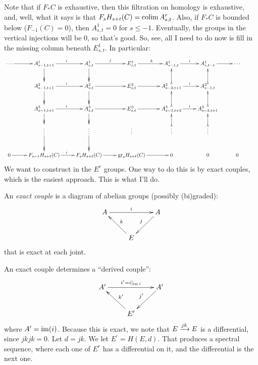 Note that if $F_\ast C$ is exhaustive, then this filtration on homology is exhaustive, and, well, what it says is that $F_s H_{s+t}(C) = \operatorname{colim} A^r_{s,t}$.
Also, if $F_\ast C$ is bounded below ($F_{-1}(C) = 0$), then $A^1_{s,t} = 0$ for $s\leq -1$.
Eventually, the groups in the vertical injections will be $0$, so that's good.
So, see, all I need to do now is fill in the missing column beneath $E^1_{s,t}$.
In particular:
\begin{equation*}
    \xymatrix{
	\cdots\ar[r] & A^1_{s-1,t+1}\ar@{->>}[d] \ar[r]^i & A^1_{s,t} \ar@{->>}[d] \ar[r]^j & E^1_{s,t} \ar[r]^k & A^1_{s-1,t}\ar[r]^i & A^1_{s,t-1} \ar[r] & \cdots\\
	& A^2_{s-1,t+1}\ar@{->>}[d]\ar[r]^i & A^2_{s,t}\ar@{->>}[d]\ar[r] & E^2_{s,t}\ar[r] & A^2_{s-2,t+1}\ar[r]^i \ar@{>->}[u] & A^2_{s-1,t}\ar@{>->}[u] & \\
	& A^3_{s-1,t+1}\ar[r]^i\ar@{->>}[d] & A^3_{s,t}\ar@{->>}[d] \ar[r] & E^3_{s,t}\ar[r] & A^3_{s-3,t+2}\ar@{>->}[u]\ar[r]^i & A^3_{s-2,t+1}\ar@{>->}[u] &\\
	& \vdots\ar@{->>}[d] & \vdots\ar@{->>}[d] & \vdots & \vdots \ar@{>->}[u] & \vdots\ar@{>->}[u] &\\
	0\ar[r] & F_{s-1} H_{s+t}(C) \ar[r]^i & F_s H_{s+t}(C) \ar[r] & \gr_s H_{s+t}(C)\ar[r] & 0 & 0 & 0 &
    }
\end{equation*}
We want to construct in the $E^r$ groups.
One way to do this is by exact couples, which is the easiest approach.
This is what I'll do.
\begin{definition}
    An \emph{exact couple} is a diagram of abelian groups (possibly (bi)graded):
    \begin{equation*}
	\xymatrix{
	    A\ar[rr]^i & & A\ar[dl]_j\\
	    & E\ar[ul]_k & 
	    }
    \end{equation*}
    that is exact at each joint.
\end{definition}
An exact couple determines a ``derived couple'':
\begin{equation*}
    \xymatrix{
	A^\prime\ar[rr]^{i^\prime = i|_{\img i}} & & A^\prime\ar[dl]_{j^\prime}\\
	& E^\prime\ar[ul]_{k^\prime} & 
        }
\end{equation*}
where $A^\prime = \operatorname{im}(i)$.
Because this is exact, we note that $E\xrightarrow{{jk}} E$ is a differential, since $jkjk = 0$.
Let $d = jk$.
We let $E^\prime = H(E,d)$.
That produces a spectral sequence, where each one of $E^r$ has a differential on it, and the differential is the next one.


